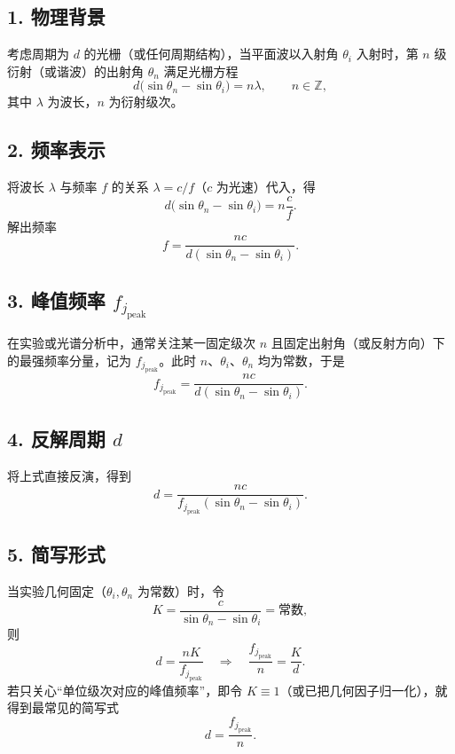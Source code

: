 \documentclass[withoutpreface,bwprint]{cumcmthesis}
\begin{document}
\subsection*{1. 物理背景}
考虑周期为 $d$ 的光栅（或任何周期结构），当平面波以入射角 $\theta_i$ 入射时，第 $n$ 级衍射（或谐波）的出射角 $\theta_n$ 满足光栅方程
\begin{equation}
d\bigl(\sin\theta_n - \sin\theta_i\bigr) = n\lambda,
\qquad
n\in\mathbb{Z},
\end{equation}
其中 $\lambda$ 为波长，$n$ 为衍射级次。

\subsection*{2. 频率表示}
将波长 $\lambda$ 与频率 $f$ 的关系 $\lambda = c/f$（$c$ 为光速）代入，得
\begin{equation}
d\bigl(\sin\theta_n - \sin\theta_i\bigr) = n\frac{c}{f}.
\end{equation}
解出频率
\begin{equation}
f = \frac{n c}{d(\sin\theta_n - \sin\theta_i)}.
\end{equation}

\subsection*{3. 峰值频率 $f_{j_{\text{peak}}}$}
在实验或光谱分析中，通常关注某一固定级次 $n$ 且固定出射角（或反射方向）下的最强频率分量，记为 $f_{j_{\text{peak}}}$。此时 $n$、$\theta_i$、$\theta_n$ 均为常数，于是
\begin{equation}
f_{j_{\text{peak}}} = \frac{n c}{d(\sin\theta_n - \sin\theta_i)}.
\end{equation}

\subsection*{4. 反解周期 $d$}
将上式直接反演，得到
\begin{equation}
\boxed{d = \frac{n c}{f_{j_{\text{peak}}}(\sin\theta_n - \sin\theta_i)}}.
\end{equation}

\subsection*{5. 简写形式}
当实验几何固定（$\theta_i,\theta_n$ 为常数）时，令
\begin{equation}
K = \frac{c}{\sin\theta_n - \sin\theta_i} = \text{常数},
\end{equation}
则
\begin{equation}
d = \frac{n K}{f_{j_{\text{peak}}}}
\quad\Longrightarrow\quad
\frac{f_{j_{\text{peak}}}}{n} = \frac{K}{d}.
\end{equation}
若只关心“单位级次对应的峰值频率”，即令 $K\equiv 1$（或已把几何因子归一化），就得到最常见的简写式
\begin{equation}
\boxed{d = \frac{f_{j_{\text{peak}}}}{n}}.
\end{equation}
\end{document}

